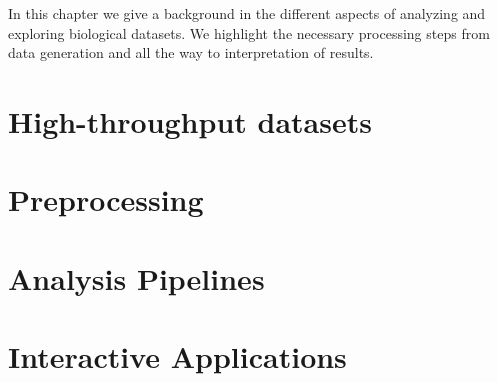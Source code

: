 In this chapter we give a background in the different aspects of analyzing and
exploring biological datasets. We highlight the necessary processing steps from
data generation and all the way to interpretation of results. 

\section{High-throughput datasets} 

\section{Preprocessing} 

\section{Analysis Pipelines}

\section{Interactive Applications} 

